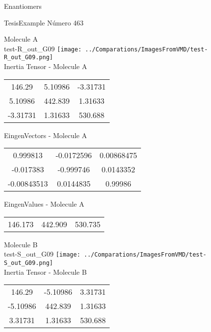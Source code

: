 \begin{center}
\vtab
\vtab
\textcolor{NavyBlue}{\Large Enantiomers}
\end{center}

 \newpage

\vtab[-2cm]
\begin{center}
{\large TesisExample \tab Número 463}
\end{center}
\begin{multicols}{2}
\begin{center}

Molecule A \\ 
test-R\_out\_G09
\texttt{[image: ../Comparations/ImagesFromVMD/test-R\_out\_G09.png]}
\\
Inertia Tensor - Molecule A \\
\vtab

\begin{tabular}{|c c c|}
146.29	 & 	5.10986	 & 	-3.31731	 \\
5.10986	 & 	442.839	 & 	1.31633	 \\
-3.31731	 & 	1.31633	 & 	530.688
\end{tabular}

\vtab
 EingenVectors - Molecule A     \\
\vtab
\begin{tabular}{|c c c|}
0.999813	 & 	-0.0172596	 & 	0.00868475	 \\
-0.017383	 & 	-0.999746	 & 	0.0143352	 \\
-0.00843513	 & 	0.0144835	 & 	0.99986
\end{tabular}

\vtab
 EingenValues - Molecule A     \\
\vtab
\begin{tabular}{|c c c|}
146.173	 & 	442.909	 & 	530.735	 \\
\end{tabular}
\columnbreak

Molecule B \\ 
test-S\_out\_G09
\texttt{[image: ../Comparations/ImagesFromVMD/test-S\_out\_G09.png]}
\\
Inertia Tensor - Molecule B \\
\vtab

\begin{tabular}{|c c c|}
146.29	 & 	-5.10986	 & 	3.31731	 \\
-5.10986	 & 	442.839	 & 	1.31633	 \\
3.31731	 & 	1.31633	 & 	530.688
\end{tabular}


\end{center}
\end{multicols}
